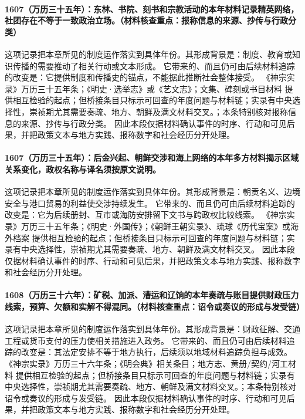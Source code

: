 \paragraph{1607（万历三十五年）：东林、书院、刻书和宗教活动的本年材料记录精英网络，社团存在不等于一致政治立场。（材料核查重点：报称信息的来源、抄传与行政分类）} 这项记录把本章所见的制度运作落实到具体年份。其形成背景是：制度、教育或知识传播的需要推动了相关行动或文本形成。 它带来的、而且仍可由后续材料追踪的改变是：它提供制度和传播史的锚点，不能据此推断社会整体接受。 《神宗实录》万历三十五年条；《明史·选举志》或《艺文志》；文集、碑刻或书目材料 提供相互检验的起点；但桥接条目只标示可回查的年度问题与材料链；实录有中央选择性，崇祯期尤其需要奏疏、地方、朝鲜及满文材料交叉。；本条特别核对报称信息的来源、抄传与行政分类。 因此本段仅据材料确认事件的时序、行动和可见后果，并把政策文本与地方实践、报称数字和社会经历分开处理。

\paragraph{1607（万历三十五年）：后金兴起、朝鲜交涉和海上网络的本年多方材料揭示区域关系变化，政权名称与译名须按原文说明。} 这项记录把本章所见的制度运作落实到具体年份。其形成背景是：朝贡名义、边境安全与港口贸易的利益使交涉持续发生。 它带来的、而且仍可由后续材料追踪的改变是：它为后续册封、互市或海防安排留下文书与跨政权比较线索。 《神宗实录》万历三十五年条；《明史·外国传》；《朝鲜王朝实录》、琉球《历代宝案》或海外档案 提供相互检验的起点；但桥接条目只标示可回查的年度问题与材料链；实录有中央选择性，崇祯期尤其需要奏疏、地方、朝鲜及满文材料交叉。 因此本段仅据材料确认事件的时序、行动和可见后果，并把政策文本与地方实践、报称数字和社会经历分开处理。

\paragraph{1608（万历三十六年）：矿税、加派、漕运和辽饷的本年奏疏与账目提供财政压力线索，预算、欠额和实解不得混同。（材料核查重点：诏令或奏议的形成与发受链）} 这项记录把本章所见的制度运作落实到具体年份。其形成背景是：财政征解、交通工程或货币支付的压力使相关措施进入政务。 它带来的、而且仍可由后续材料追踪的改变是：其法定安排不等于地方执行，后续须以地域材料追踪负担与成效。 《神宗实录》万历三十六年条；《明会典》相关条目；地方志、黄册/契约/河工材料 提供相互检验的起点；但桥接条目只标示可回查的年度问题与材料链；实录有中央选择性，崇祯期尤其需要奏疏、地方、朝鲜及满文材料交叉。；本条特别核对诏令或奏议的形成与发受链。 因此本段仅据材料确认事件的时序、行动和可见后果，并把政策文本与地方实践、报称数字和社会经历分开处理。

